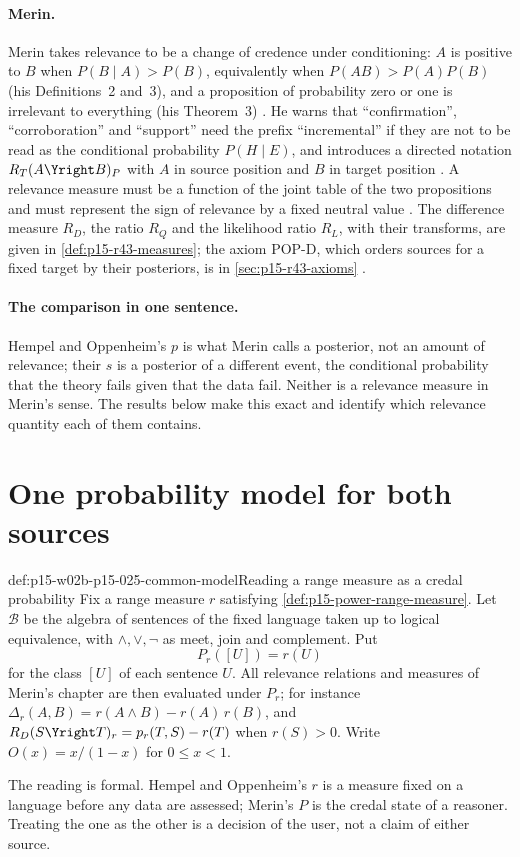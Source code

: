 \paragraph{Merin.}
Merin takes relevance to be a change of credence under conditioning:
\(A\) is positive to \(B\) when \(P(B\mid A)>P(B)\), equivalently when
\(P(AB)>P(A)P(B)\) (his Definitions~2 and~3), and a proposition of
probability zero or one is irrelevant to everything (his Theorem~3)
\cite[p.~266]{Merin2021Relevance}. He warns that ``confirmation'',
``corroboration'' and ``support'' need the prefix ``incremental'' if
they are not to be read as the conditional probability \(P(H\mid E)\),
and introduces a directed notation \(R_T(A\Yright B)_P\) with \(A\) in
source position and \(B\) in target position
\cite[p.~268, Definition~6]{Merin2021Relevance}. A relevance measure
must be a function of the joint table of the two propositions and must
represent the sign of relevance by a fixed neutral value
\cite[p.~269, Definition~8]{Merin2021Relevance}. The difference measure
\(R_D\), the ratio \(R_Q\) and the likelihood ratio \(R_L\), with their
transforms, are given in \cref{def:p15-r43-measures}; the axiom POP-D,
which orders sources for a fixed target by their posteriors, is in
\cref{sec:p15-r43-axioms} \cite[pp.~269--271]{Merin2021Relevance}.

\paragraph{The comparison in one sentence.}
Hempel and Oppenheim's \(p\) is what Merin calls a posterior, not an
amount of relevance; their \(s\) is a posterior of a different event,
the conditional probability that the theory fails given that the data
fail. Neither is a relevance measure in Merin's sense. The results below
make this exact and identify which relevance quantity each of them
contains.

\section{One probability model for both sources}
\label{sec:p15-w02b-p15-025-model}

\begin{hbconvention}{def:p15-w02b-p15-025-common-model}{Reading a range measure as a credal probability}
Fix a range measure \(r\) satisfying
\cref{def:p15-power-range-measure}. Let \(\mathcal B\) be the algebra of
sentences of the fixed language taken up to logical equivalence, with
\(\wedge,\vee,\neg\) as meet, join and complement. Put
\[
 P_r([U])=r(U)
\]
for the class \([U]\) of each sentence \(U\). All relevance relations
and measures of Merin's chapter are then evaluated under \(P_r\); for
instance \(\Delta_r(A,B)=r(A\wedge B)-r(A)\,r(B)\), and
\(R_D(S\Yright T)_r=p_r(T,S)-r(T)\) when \(r(S)>0\). Write
\(O(x)=x/(1-x)\) for \(0\le x<1\).

The reading is formal. Hempel and Oppenheim's \(r\) is a measure fixed
on a language before any data are assessed; Merin's \(P\) is the credal
state of a reasoner. Treating the one as the other is a decision of the
user, not a claim of either source.
\end{hbconvention}

